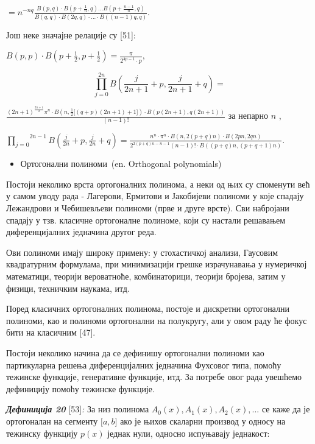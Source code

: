 \(= n^{- nq}\frac{B(p,q) \cdot B(p + \frac{1}{n},q)...B(p + \frac{n - 1}{n},q)}{B(q,q) \cdot B(2q,q) \cdot ... \cdot B((n - 1)q,q)}\).

Још неке значајне релације су {[}51{]}:

\(B(p,p) \cdot B(p + \frac{1}{2},p + \frac{1}{2}) = \frac{\pi}{2^{4p - 1} \cdot p}\),

\[\overset{2n}{\prod_{j = 0}}B(\frac{j}{2n + 1} + p,\frac{j}{2n + 1} + q) =\]

\(\frac{{(2n + 1)}^{\frac{2n + 1}{2}}\pi^{n} \cdot B(n,\frac{1}{2}\lbrack(q + p)(2n + 1) + 1\rbrack) \cdot B(p(2n + 1),q(2n + 1))}{(n - 1)!}\)
за непарно \(n\) ,

\(\overset{2n - 1}{\prod_{j = 0}}B(\frac{j}{2n} + p,\frac{j}{2n} + q) = \frac{n^{n} \cdot \pi^{n} \cdot B(n,2(p + q)n) \cdot B(2pn,2qn)}{2^{2(p + q)n - n - 1}(n - 1)! \cdot B((p + q)n,(p + q + 1)n)}\).

\begin{itemize}
\item
  Ортогонални полиноми~(en. Orthogonal polynomials)
\end{itemize}

Постоји неколико врста ортогоналних полинома, а неки од њих су споменути
већ у самом уводу рада - Лагерови, Ермитови и Јакобијеви полиноми у које
спадају Лежандрови и Чебишевљеви полиноми (прве и друге врсте). Сви
набројани спадају у тзв. класичне ортогоналне полиноме, који су настали
решавањем диференцијалних једначина другог реда.

Ови полиноми имају широку примену: у стохастичкој анализи, Гаусовим
квадратурним формулама, при минимизацији грешке израчунавања у
нумеричкој математици, теорији вероватноће, комбинаторици, теорији
бројева, затим у физици, техничким наукама, итд.

Поред класичних ортогоналних полинома, постоје и дискретни ортогонални
полиноми, као и полиноми ортогонални на полукругу, али у овом раду ће
фокус бити на класичним {[}47{]}.

Постоји неколико начина да се дефинишу ортогонални полиноми као
партикуларна решења диференцијалних једначина Фухсовог типа, помоћу
тежинске функције, генеративне функције, итд. За потребе овог рада
увешћемо дефиницију помоћу тежинске функције.

\emph{\textbf{Дефиниција 20}} {[}53{]}\emph{:} За низ полинома
\(A_{0}(x),A_{1}(x),A_{2}(x),...\) се каже да је ортогоналан на сегменту
\(\lbrack a,b\rbrack\) ако је њихов скаларни производ у односу на
тежинску функцију \(p(x)\) једнак нули, односно испуњавају једнакост:

